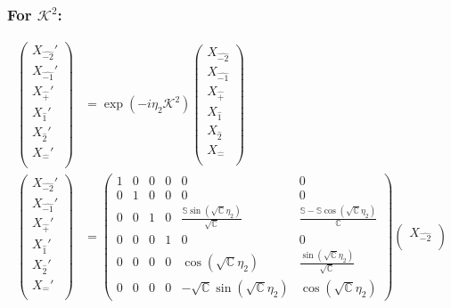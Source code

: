 \documentclass[]{article}
\numberwithin{equation}{section}
\begin{document}
{{\subsubsection{For $\mathcal{K}^{2}$:}
\begin{align}
\begin{pmatrix}
    {X}_{\hat{-2}}'\\
    {X}_{\hat{-1}}'\\
    {X}_{\hat{+}}'\\
    {X}_{\hat{1}}'\\
    {X}_{\hat{2}}'\\
    {X}_{\hat{-}}'\\
    \end{pmatrix}&= \exp{(-i\eta_{2} \mathcal{K}^{2})}\begin{pmatrix}
    {X}_{\hat{-2}}\\
    {X}_{\hat{-1}}\\
    {X}_{\hat{+}}\\
    {X}_{\hat{1}}\\
    {X}_{\hat{2}}\\
    {X}_{\hat{-}}\\
    \end{pmatrix}\\
    \begin{pmatrix}
    {X}_{\hat{-2}}'\\
    {X}_{\hat{-1}}'\\
    {X}_{\hat{+}}'\\
    {X}_{\hat{1}}'\\
    {X}_{\hat{2}}'\\
    {X}_{\hat{-}}'\\
    \end{pmatrix}&= \begin{pmatrix}
        1&0&0&0&0&0\\
        0&1&0&0&0&0\\
        0&0&1&0&\frac{\mathbb{S}\sin{(\sqrt{\mathbb{C}}\eta_{2})}}{\sqrt{\mathbb{C}}}&\frac{\mathbb{S}-\mathbb{S}\cos{(\sqrt{\mathbb{C}}\eta_{2})}}{\mathbb{C}}\\
        0&0&0&1&0&0\\
        0&0&0&0&\cos{(\sqrt{\mathbb{C}}\eta_{2})}&\frac{\sin{(\sqrt{\mathbb{C}}\eta_{2})}}{\sqrt{\mathbb{C}}}\\
        0&0&0&0&-\sqrt{\mathbb{C}}\sin{(\sqrt{\mathbb{C}}\eta_{2})}&\cos{(\sqrt{\mathbb{C}}\eta_{2})}
    \end{pmatrix}\begin{pmatrix}
    {X}_{\hat{-2}}\\

\end{pmatrix}
\end{align}}}
\end{document}
